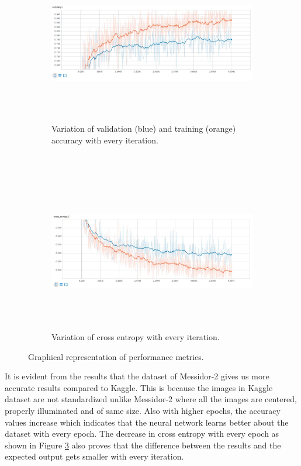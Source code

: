 \documentclass[12pt]{report}
\begin{document}
\begin{figure}[H]
\centering
\begin{subfigure}{1\textwidth}
  \centering
  \includegraphics[width = 15cm, height =7cm]{Capture9}
  \caption{Variation of validation (blue) and training (orange) accuracy with every iteration.}
  \label{fig:sub9}
\end{subfigure}
\\
\begin{subfigure}{1\textwidth}
  \centering
  \includegraphics[width = 15cm, height =7cm]{Capture10}
  \caption{Variation of cross entropy with every iteration.}
  \label{fig:sub10}
\end{subfigure}
\caption{Graphical representation of performance metrics. }
\label{fig:test8}
\end{figure}

\noindent It is evident from the results that the dataset of Messidor-2 gives us more accurate results compared to Kaggle. This is because the images in Kaggle dataset are not standardized unlike Messidor-2 where all the images are centered, properly illuminated and of same size. Also with higher epochs, the accuracy values increase which indicates that the neural network learns better about the dataset with every epoch. The decrease in cross entropy with every epoch as shown in Figure \ref{fig:test8} also proves that the difference between the results and the expected output gets smaller with every iteration. 
\end{document}
